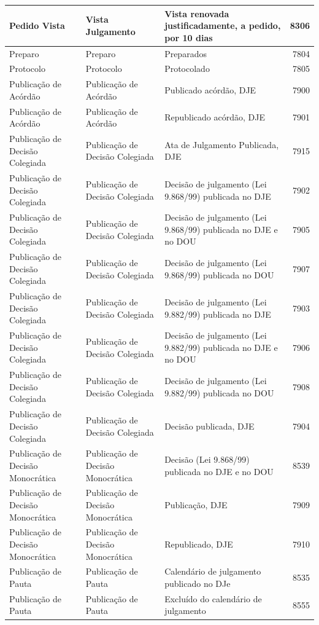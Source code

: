 \documentclass[
]{book}
\begin{document}
\begin{tabular}{l|l|l|r}
\hline
Pedido Vista & Vista Julgamento & Vista renovada justificadamente, a pedido, por 10 dias & 8306\\
\hline
Preparo & Preparo & Preparados & 7804\\
\hline
Protocolo & Protocolo & Protocolado & 7805\\
\hline
Publicação de Acórdão & Publicação de Acórdão & Publicado acórdão, DJE & 7900\\
\hline
Publicação de Acórdão & Publicação de Acórdão & Republicado acórdão, DJE & 7901\\
\hline
Publicação de Decisão Colegiada & Publicação de Decisão Colegiada & Ata de Julgamento Publicada, DJE & 7915\\
\hline
Publicação de Decisão Colegiada & Publicação de Decisão Colegiada & Decisão de julgamento (Lei 9.868/99) publicada no DJE & 7902\\
\hline
Publicação de Decisão Colegiada & Publicação de Decisão Colegiada & Decisão de julgamento (Lei 9.868/99) publicada no DJE e no DOU & 7905\\
\hline
Publicação de Decisão Colegiada & Publicação de Decisão Colegiada & Decisão de julgamento (Lei 9.868/99) publicada no DOU & 7907\\
\hline
Publicação de Decisão Colegiada & Publicação de Decisão Colegiada & Decisão de julgamento (Lei 9.882/99) publicada no DJE & 7903\\
\hline
Publicação de Decisão Colegiada & Publicação de Decisão Colegiada & Decisão de julgamento (Lei 9.882/99) publicada no DJE e no DOU & 7906\\
\hline
Publicação de Decisão Colegiada & Publicação de Decisão Colegiada & Decisão de julgamento (Lei 9.882/99) publicada no DOU & 7908\\
\hline
Publicação de Decisão Colegiada & Publicação de Decisão Colegiada & Decisão publicada, DJE & 7904\\
\hline
Publicação de Decisão Monocrática & Publicação de Decisão Monocrática & Decisão (Lei 9.868/99) publicada no DJE e no DOU & 8539\\
\hline
Publicação de Decisão Monocrática & Publicação de Decisão Monocrática & Publicação, DJE & 7909\\
\hline
Publicação de Decisão Monocrática & Publicação de Decisão Monocrática & Republicado, DJE & 7910\\
\hline
Publicação de Pauta & Publicação de Pauta & Calendário de julgamento publicado no DJe & 8535\\
\hline
Publicação de Pauta & Publicação de Pauta & Excluído do calendário de julgamento & 8555\\

\end{tabular}
\end{document}
